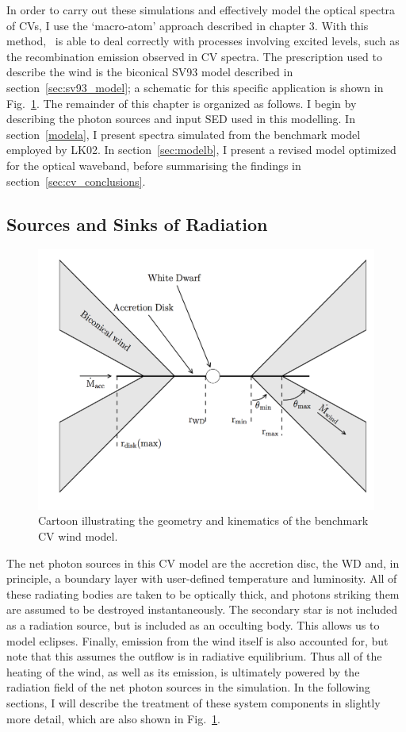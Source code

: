 In order to carry out these simulations and effectively model the optical
spectra of CVs, I use the `macro-atom' approach described in chapter 3. 
With this method, \py\ is able to deal correctly with processes involving
excited levels, such as the recombination emission observed in CV spectra.
The prescription used to describe the wind is the biconical SV93 model described in 
section~\ref{sec:sv93_model}; a schematic for this specific application
is shown in Fig.~\ref{cartoon}. The remainder of this chapter is organized as follows. I begin
by describing the photon sources and input SED used in this modelling.
In section~\ref{modela}, I present spectra simulated from the benchmark 
model employed by LK02. In section~\ref{sec:modelb}, I present a revised model
optimized for the optical waveband, before summarising the
findings in section~\ref{sec:cv_conclusions}.


\subsection{Sources and Sinks of Radiation}
\label{radsources}

\begin{figure} 
\centering
\includegraphics[width=1.0\textwidth]{figures/05-cvpaper/fig2_cartoon.png}
\caption{Cartoon illustrating the geometry and kinematics of the benchmark CV wind model.}
\label{cartoon}
\end{figure} 

The net photon sources in this CV model are the accretion disc, the
WD and, in principle, a boundary layer with user-defined temperature
and luminosity. All of these radiating bodies are taken to be
optically thick, and photons striking them are assumed to be destroyed
instantaneously. The secondary star is not included as a radiation
source, but is included as an occulting body. This allows us to model
eclipses. Finally, emission from the wind itself is also accounted for, but
note that this assumes the outflow is in radiative equilibrium. Thus all
of the heating of the wind, as well as its emission, is ultimately
powered by the radiation field of the net photon sources in the
simulation. In the following sections, I will describe the treatment
of these system components in slightly more detail, which are also
shown in Fig.~\ref{cartoon}.

